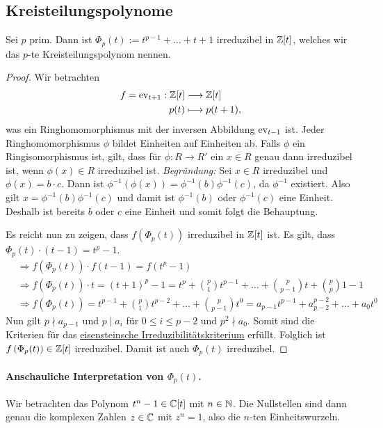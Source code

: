 \documentclass[12pt,a4paper]{scrartcl}
\begin{document}

\subsection{Kreisteilungspolynome}\label{sec:kreisteil}
\begin{anw}
Sei $p$ prim. Dann ist $\Phi_p(t) := t^{p-1}+\dots +t+1$ irreduzibel in $\mathbb Z[t]$, welches wir das $p$-te Kreisteilungspolynom nennen.
\end{anw}

\begin{proof}
	Wir betrachten
	\begin{align*}
		f = \operatorname{ev}_{t+1} : \mathbb Z[t] &\longrightarrow \mathbb Z[t] \\
		p(t) &\longmapsto p(t+1) ,
	\end{align*}
	was ein Ringhomomorphismus mit der inversen Abbildung $\operatorname{ev}_{t-1}$ ist. Jeder Ringhomomorphismus $\phi$ bildet Einheiten auf Einheiten ab. Falls $\phi$ ein Ringisomorphismus ist, gilt, dass für $\phi: R \to R'$ ein $x \in R$ genau dann irreduzibel ist, wenn $\phi(x) \in R$ irreduzibel ist.
	\textit{Begründung:} Sei $x \in R$ irreduzibel und $\phi(x) = b\cdot c$. Dann ist $\phi^{-1}\left( \phi (x) \right) = \phi^{-1} (b) \phi^{-1} (c) $, da $\phi^{-1}$ existiert. Also gilt $x = \phi^{-1} (b) \phi^{-1} (c) $ und damit ist $\phi^{-1}(b)$ oder $\phi^{-1}(c)$ eine Einheit. Deshalb ist bereits $b$ oder $c$ eine Einheit und somit folgt die Behauptung.
	
	Es reicht nun zu zeigen, dass $f\left(\Phi_p(t) \right) $ irreduzibel in $\mathbb Z[t]$ ist. Es gilt, dass $\Phi_p(t)\cdot(t-1) = t^p - 1$.
	\begin{align*}
		&\Rightarrow f(\Phi_p(t))\cdot f(t-1) = f(t^p - 1) \\
		&\Rightarrow f(\Phi_p(t)) \cdot t = (t + 1)^p - 1 = t^p + \binom{p}{1}t^{p-1} + \dots + \binom{p}{p-1} t + \binom{p}{p} 1 - 1 \\
		&\Rightarrow f(\Phi_p(t)) = t^{p-1} + \binom{p}{1}t^{p-2} + \dots + \binom{p}{p-1}t^0 = a_{p-1}t^{p-1} + a_{p-2}^{p-2} + \dots + a_0t^0
	\end{align*}
	Nun gilt $p \nmid a_{p-1}$ und $p \mid a_i$ für $0 \leq i \leq p-2$ und $p^2 \nmid a_0$. Somit sind die Kriterien für das \hyperref[thm:eisenstein]{eisensteinsche Irreduzibilitätskriterium} erfüllt. Folglich ist $f\left( \Phi_p(t) \right) \in \mathbb Z[t]$ irreduzibel. Damit ist auch $\Phi_p(t)$ irreduzibel.
\end{proof}

\paragraph{Anschauliche Interpretation von $\Phi_p(t)$.} Wir betrachten das Polynom $t^n-1 \in \mathbb C[t]$ mit $n \in \mathbb N$. Die Nullstellen sind dann genau die komplexen Zahlen $z \in \mathbb C$ mit $z^n = 1$, also die $n$-ten Einheitswurzeln. 
\end{document}
